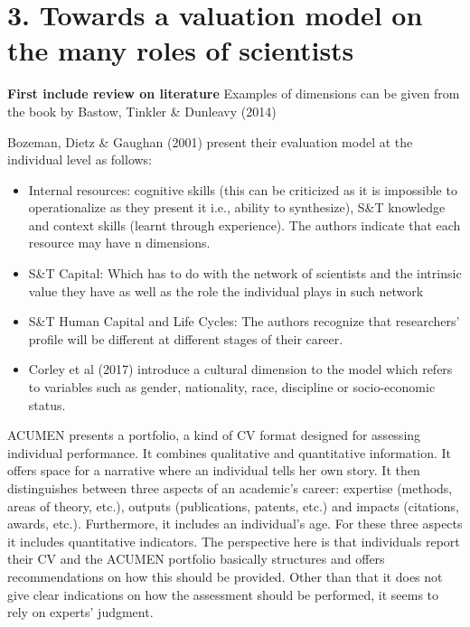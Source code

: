 \documentclass[]{elsarticle} %
\providecommand{\tightlist}{%
  \setlength{\itemsep}{0pt}\setlength{\parskip}{0pt}}
\begin{document}
\hypertarget{towards-a-valuation-model-on-the-many-roles-of-scientists}{%
\section{3. Towards a valuation model on the many roles of
scientists}\label{towards-a-valuation-model-on-the-many-roles-of-scientists}}

\textbf{First include review on literature} Examples of dimensions can
be given from the book by Bastow, Tinkler \& Dunleavy (2014)

Bozeman, Dietz \& Gaughan (2001) present their evaluation model at the
individual level as follows:

\begin{itemize}
\tightlist
\item
  Internal resources: cognitive skills (this can be criticized as it is
  impossible to operationalize as they present it i.e., ability to
  synthesize), S\&T knowledge and context skills (learnt through
  experience). The authors indicate that each resource may have n
  dimensions.
\item
  S\&T Capital: Which has to do with the network of scientists and the
  intrinsic value they have as well as the role the individual plays in
  such network
\item
  S\&T Human Capital and Life Cycles: The authors recognize that
  researchers' profile will be different at different stages of their
  career.
\item
  Corley et al (2017) introduce a cultural dimension to the model which
  refers to variables such as gender, nationality, race, discipline or
  socio-economic status.
\end{itemize}

ACUMEN presents a portfolio, a kind of CV format designed for assessing
individual performance. It combines qualitative and quantitative
information. It offers space for a narrative where an individual tells
her own story. It then distinguishes between three aspects of an
academic's career: expertise (methods, areas of theory, etc.), outputs
(publications, patents, etc.) and impacts (citations, awards, etc.).
Furthermore, it includes an individual's age. For these three aspects it
includes quantitative indicators. The perspective here is that
individuals report their CV and the ACUMEN portfolio basically
structures and offers recommendations on how this should be provided.
Other than that it does not give clear indications on how the assessment
should be performed, it seems to rely on experts' judgment.
\end{document}
